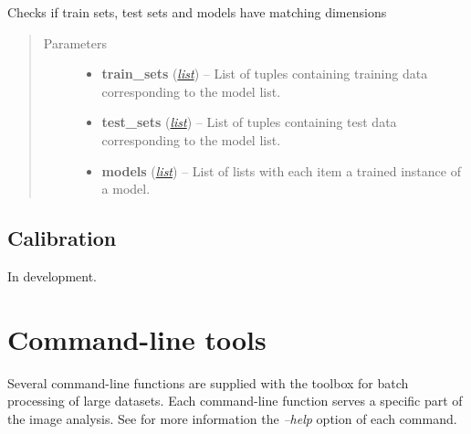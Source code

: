 \documentclass[letterpaper,10pt,english]{sphinxmanual}
\begin{document}
\begin{fulllineitems}
\label{flamingo/classification/index:flamingo.classification.utils.check_sets}
Checks if train sets, test sets and models have matching dimensions
\begin{quote}\begin{description}
\item[{Parameters}] \leavevmode\begin{itemize}
\item {} 
\textbf{train\_sets} (\href{http://docs.python.org/library/functions.html\#list}{\emph{list}}) -- List of tuples containing training data corresponding to the model list.

\item {} 
\textbf{test\_sets} (\href{http://docs.python.org/library/functions.html\#list}{\emph{list}}) -- List of tuples containing test data corresponding to the model list.

\item {} 
\textbf{models} (\href{http://docs.python.org/library/functions.html\#list}{\emph{list}}) -- List of lists with each item a trained instance of a model.

\end{itemize}

\end{description}\end{quote}

\end{fulllineitems}



\section{Calibration}
\label{flamingo/calibration/index::doc}\label{flamingo/calibration/index:calibration}
In development.


\chapter{Command-line tools}
\label{index:command-line-tools}
Several command-line functions are supplied with the toolbox for batch processing of large datasets.
Each command-line function serves a specific part of the image analysis.
See for more information the \emph{--help} option of each command.
\end{document}
